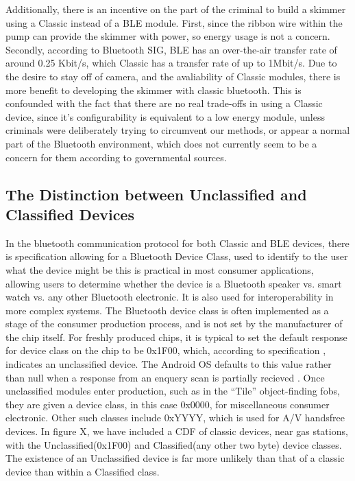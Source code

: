 Additionally, there is an incentive on the part of the criminal to build a skimmer using a
Classic instead of a BLE module. First, since the ribbon wire within the pump can provide
the skimmer with power, so energy usage is not a concern. Secondly, according to Bluetooth
SIG, BLE has an over-the-air transfer rate of around 0.25 Kbit/s, which Classic has a transfer
rate of up to 1Mbit/s.  Due to the desire to stay off of camera, and the avaliability of
Classic modules, there is more benefit to developing the skimmer with classic bluetooth. This
is confounded with the fact that there are no real trade-offs in using a Classic device, since
it's configurability is equivalent to a low energy module, unless criminals were deliberately
trying to circumvent our methods, or appear a normal part of the Bluetooth environment, which
does not currently seem to be a concern for them according to governmental sources.

\subsection{The Distinction between Unclassified and Classified Devices}

In the bluetooth communication protocol for both Classic and BLE devices, there is specification
allowing for a Bluetooth Device Class, used to identify to the user what the device might be
this is practical in most consumer applications, allowing users to determine whether the
device is a Bluetooth speaker vs. smart watch vs. any other Bluetooth electronic. It is also
used for interoperability in more complex systems. The Bluetooth device class is often
implemented as a stage of the consumer production process, and is not set by the manufacturer of
the chip itself. For freshly produced chips, it is typical to set the default response for
device class on the chip to be 0x1F00, which, according to specification ,
indicates an unclassified device. The Android OS defaults to this value rather than null when
a response from an enquery scan is partially recieved .
Once unclassified modules enter production, such as in the ``Tile'' object-finding fobs, they
are given a device class, in this case 0x0000, for miscellaneous consumer electronic. Other
such classes include 0xYYYY, which is used for A/V handsfree devices. In figure X, we have
included a CDF of classic devices, near gas stations, with the Unclassified(0x1F00) and
Classified(any other two byte) device classes. The existence of an Unclassified device is
far more unlikely than that of a classic device than within a Classified class.

